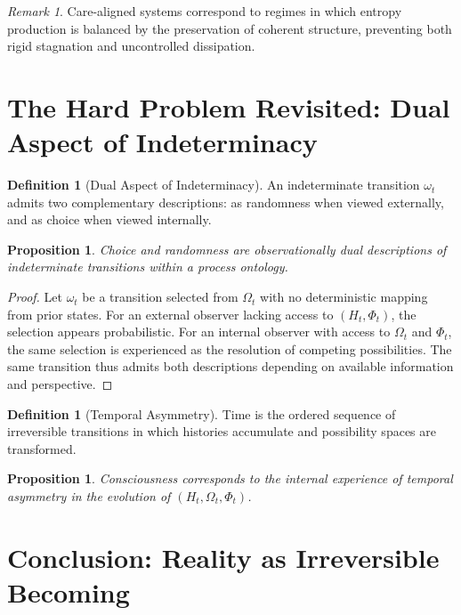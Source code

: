 \documentclass[11pt,a4paper]{article}
\newtheorem{proposition}[theorem]{Proposition}
\theoremstyle{definition}
\newtheorem{definition}[theorem]{Definition}
\theoremstyle{remark}
\newtheorem{remark}[theorem]{Remark}
\begin{document}
\begin{remark}
Care-aligned systems correspond to regimes in which entropy production is balanced by the preservation of coherent structure, preventing both rigid stagnation and uncontrolled dissipation.
\end{remark}

\section{The Hard Problem Revisited: Dual Aspect of Indeterminacy}

\begin{definition}[Dual Aspect of Indeterminacy]
An indeterminate transition $\omega_t$ admits two complementary descriptions: as randomness when viewed externally, and as choice when viewed internally.
\end{definition}

\begin{proposition}
Choice and randomness are observationally dual descriptions of indeterminate transitions within a process ontology.
\end{proposition}

\begin{proof}
Let $\omega_t$ be a transition selected from $\Omega_t$ with no deterministic mapping from prior states. For an external observer lacking access to $(H_t, \Phi_t)$, the selection appears probabilistic. For an internal observer with access to $\Omega_t$ and $\Phi_t$, the same selection is experienced as the resolution of competing possibilities. The same transition thus admits both descriptions depending on available information and perspective.
\end{proof}

\begin{definition}[Temporal Asymmetry]
Time is the ordered sequence of irreversible transitions in which histories accumulate and possibility spaces are transformed.
\end{definition}

\begin{proposition}
Consciousness corresponds to the internal experience of temporal asymmetry in the evolution of $(H_t, \Omega_t, \Phi_t)$.
\end{proposition}

\section{Conclusion: Reality as Irreversible Becoming}
\end{document}
